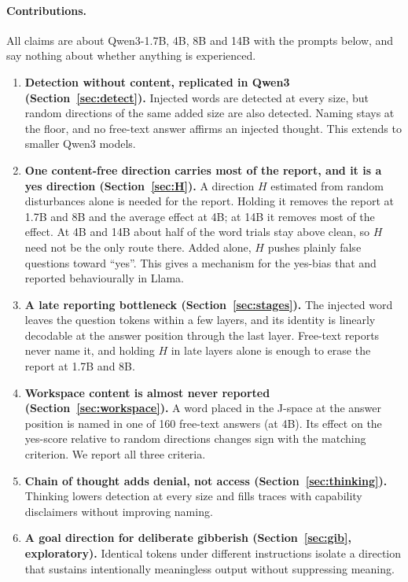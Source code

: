 \documentclass[11pt]{article}
\newcommand{\ys}{yes-score}
\begin{document}
\paragraph{Contributions.} All claims are about Qwen3-1.7B, 4B, 8B and 14B with the prompts below, and say nothing about whether anything is experienced.
\begin{enumerate}[leftmargin=*]
  \item \textbf{Detection without content, replicated in Qwen3 (Section~\ref{sec:detect}).} Injected words are detected at every size, but random directions of the same added size are also detected. Naming stays at the floor, and no free-text answer affirms an injected thought. This extends \citet{lederman2026content} to smaller Qwen3 models.
  \item \textbf{One content-free direction carries most of the report, and it is a yes direction (Section~\ref{sec:H}).} A direction $H$ estimated from random disturbances alone is needed for the report. Holding it removes the report at 1.7B and 8B and the average effect at 4B; at 14B it removes most of the effect. At 4B and 14B about half of the word trials stay above clean, so $H$ need not be the only route there. Added alone, $H$ pushes plainly false questions toward ``yes''. This gives a mechanism for the yes-bias that \citet{godet2025confusion} and \citet{hahami2026disturbance} reported behaviourally in Llama.
  \item \textbf{A late reporting bottleneck (Section~\ref{sec:stages}).} The injected word leaves the question tokens within a few layers, and its identity is linearly decodable at the answer position through the last layer. Free-text reports never name it, and holding $H$ in late layers alone is enough to erase the report at 1.7B and 8B.
  \item \textbf{Workspace content is almost never reported (Section~\ref{sec:workspace}).} A word placed in the J-space at the answer position is named in one of 160 free-text answers (at 4B). Its effect on the \ys{} relative to random directions changes sign with the matching criterion. We report all three criteria.
  \item \textbf{Chain of thought adds denial, not access (Section~\ref{sec:thinking}).} Thinking lowers detection at every size and fills traces with capability disclaimers without improving naming.
  \item \textbf{A goal direction for deliberate gibberish (Section~\ref{sec:gib}, exploratory).} Identical tokens under different instructions isolate a direction that sustains intentionally meaningless output without suppressing meaning.
\end{enumerate}
\end{document}
